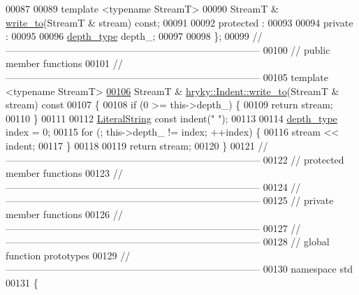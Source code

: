 \begin{DoxyCode}
00087 
00089     \textcolor{keyword}{template} <\textcolor{keyword}{typename} StreamT>
00090     StreamT & \hyperlink{classhryky_1_1_indent_a3dcdc6227cdbfa80da9791c243c24818}{write_to}(StreamT & stream) \textcolor{keyword}{const};
00091 
00092 \textcolor{keyword}{protected} :
00093 
00094 \textcolor{keyword}{private} :
00095 
00096     \hyperlink{classhryky_1_1_indent_a38d8402509b64e77009a1a86b6be4939}{depth_type}      depth\_;
00097 
00098 \};
00099 \textcolor{comment}{//
      ------------------------------------------------------------------------------}
00100 \textcolor{comment}{// public member functions}
00101 \textcolor{comment}{//
      ------------------------------------------------------------------------------}
00105 \textcolor{comment}{}\textcolor{keyword}{template} <\textcolor{keyword}{typename} StreamT>
\hypertarget{indent_8h_source_l00106}{}\hyperlink{classhryky_1_1_indent_a3dcdc6227cdbfa80da9791c243c24818}{00106} StreamT & \hyperlink{classhryky_1_1_indent_a3dcdc6227cdbfa80da9791c243c24818}{hryky::Indent::write_to}(StreamT & stream)\textcolor{keyword}{ const}
00107 \textcolor{keyword}{}\{
00108     \textcolor{keywordflow}{if} (0 >= this->depth\_) \{
00109         \textcolor{keywordflow}{return} stream;
00110     \}
00111     
00112     \hyperlink{classhryky_1_1_literal_string}{LiteralString} \textcolor{keyword}{const} indent(\textcolor{stringliteral}{"  "});
00113 
00114     \hyperlink{classhryky_1_1_indent_a38d8402509b64e77009a1a86b6be4939}{depth_type} index = 0;
00115     \textcolor{keywordflow}{for} (; this->depth\_ != index; ++index) \{
00116         stream << indent;
00117     \}
00118 
00119     \textcolor{keywordflow}{return} stream;
00120 \}
00121 \textcolor{comment}{//
      ------------------------------------------------------------------------------}
00122 \textcolor{comment}{// protected member functions}
00123 \textcolor{comment}{//
      ------------------------------------------------------------------------------}
00124 \textcolor{comment}{//
      ------------------------------------------------------------------------------}
00125 \textcolor{comment}{// private member functions}
00126 \textcolor{comment}{//
      ------------------------------------------------------------------------------}
00127 \textcolor{comment}{//
      ------------------------------------------------------------------------------}
00128 \textcolor{comment}{// global function prototypes}
00129 \textcolor{comment}{//
      ------------------------------------------------------------------------------}
00130 \textcolor{keyword}{namespace }std
00131 \{

\end{DoxyCode}
